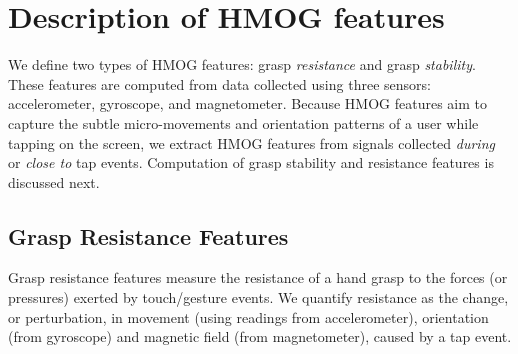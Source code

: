 %
\section{Description of HMOG features} \label{sectionFeatures}



We define two types of HMOG features: grasp {\em resistance} and grasp {\em stability}. These features are computed from data collected using three sensors: accelerometer, gyroscope, and magnetometer. Because HMOG features aim to capture the subtle micro-movements and orientation patterns of a user while tapping on the screen, we extract HMOG features from signals collected {\em during} or {\em close to} tap events.  
Computation of grasp stability and resistance features is discussed next.
%




%
%
%
%
%
%


%
%



\subsection{Grasp Resistance Features} 
Grasp resistance features measure the resistance of a hand grasp to the forces (or pressures) exerted by touch/gesture events. We quantify resistance as the change, or perturbation, in movement (using readings from accelerometer), orientation (from gyroscope) and magnetic field (from magnetometer), caused by a tap event. 


